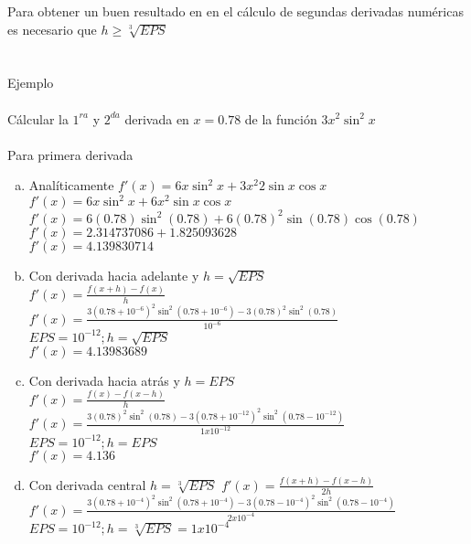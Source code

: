 Para obtener un buen resultado en en el c\'alculo de segundas derivadas num\'ericas es necesario que $h\geq\sqrt[3]{EPS}$ \\ \\ \\
Ejemplo\\ \\
C\'alcular la $1^{ra}$ y $2^{da}$ derivada en $x=0.78$ de la funci\'on $3x^2\sin^2x$\\ \\
Para primera derivada
\begin{enumerate}[a)]
\item Anal\'iticamente
$f'(x)=6x\sin^2 x+3x^2 2\sin x \cos x$\\
$f'(x)=6x\sin^2 x+6x^2\sin x \cos x$\\
$f'(x)=6(0.78)\sin^2 (0.78)+6(0.78)^2\sin (0.78) \cos (0.78)$\\
$f'(x)=2.314737086+1.825093628$\\
$f'(x)=4.139830714$\\
\item Con derivada hacia adelante y $h=\sqrt{EPS}$\\
$f'(x)=\frac{f(x+h)-f(x)}{h}$\\
$f'(x)=\frac{3(0.78+10^{-6})^2\sin^2(0.78+10^{-6})-3(0.78)^2\sin^2(0.78)}{10^{-6}}$\\
$EPS=10^{-12};$\quad $h=\sqrt{EPS}$\\
$f'(x)=4.13983689$\\ 
\item Con derivada hacia atr\'as y $h=EPS$\\
$f'(x)=\frac{f(x)-f(x-h)}{h}$\\
$f'(x)=\frac{3(0.78)^2\sin^2(0.78)-3(0.78+10^{-12})^2\sin^2(0.78-10^{-12})}{1x10^{-12}}$\\
$EPS=10^{-12};$\quad $h=EPS$\\
$f'(x)=4.136$\\ 
\item Con derivada central $h=\sqrt[3]{EPS}$
$f'(x)=\frac{f(x+h)-f(x-h)}{2h}$\\
$f'(x)=\frac{3(0.78+10^{-4})^2\sin^2(0.78+10^{-4})-3(0.78-10^{-4})^2\sin^2(0.78-10^{-4})}{2x10^{-4}}$\\
$EPS=10^{-12};$\quad $h=\sqrt[3]{EPS}=1x10^{-4}$\\
\end{enumerate}



